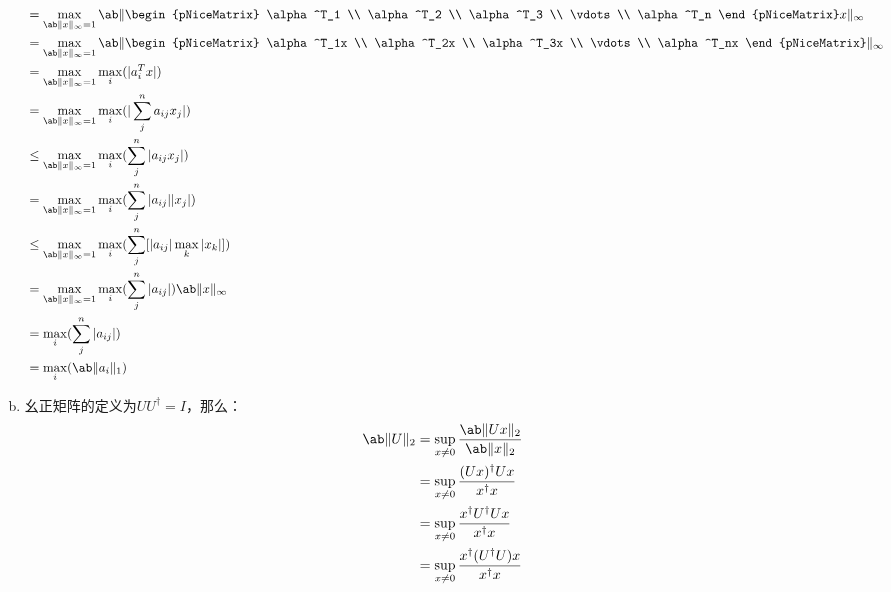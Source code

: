 \documentclass[12pt, a4paper, oneside]{article}
\begin{document}
\begin{enumerate}[(a)]
\begin{align*}
                    &= \max_{\norm{x}_\infty=1}\norm{
                    \begin{pNiceMatrix}
                    \alpha^T_1 \\
                    \alpha^T_2 \\
                    \alpha^T_3 \\
                    \vdots \\
                    \alpha^T_n 
                    \end{pNiceMatrix}x}_\infty\\
                    &= \max_{\norm{x}_\infty=1} \norm{\begin{pNiceMatrix}
                    \alpha^T_1x \\
                    \alpha^T_2x \\
                    \alpha^T_3x \\
                    \vdots \\
                    \alpha^T_nx
                    \end{pNiceMatrix}}_\infty\\
                    &= \max_{\norm{x}_\infty=1} \max_i(|a_i^Tx|)\\
                    &= \max_{\norm{x}_\infty=1} \max_i(|\sum_j^n{a_{ij}x_j}|)\\
                    &\le \max_{\norm{x}_\infty=1} \max_i(\sum_j^n{|a_{ij}x_j}|)\\
                    &= \max_{\norm{x}_\infty=1} \max_i(\sum_j^n{|a_{ij}||x_j}|)\\
                    &\le \max_{\norm{x}_\infty=1} \max_i(\sum_j^n[|a_{ij}|\max_k|x_k|])\\
                    &= \max_{\norm{x}_\infty=1} \max_i(\sum_j^n|a_{ij}|)\norm{x}_\infty\\
                    &= \max_i(\sum_j^n|a_{ij}|) \\
                    &= \max_i(\norm{a_i}_1)
\end{align*}
\item 幺正矩阵的定义为$UU^{\dagger}=I$，那么：
\begin{align*}
    \norm{U}_2 &= \sup_{x\neq 0}\frac{\norm{Ux}_2}{\norm{x}_2}\\
    &=\sup_{x\neq 0}\frac{(Ux)^\dagger Ux}{x^\dagger x}\\
    &=\sup_{x\neq 0}\frac{x^\dagger U^\dagger Ux}{x^\dagger x}\\
    &=\sup_{x\neq 0}\frac{x^\dagger (U^\dagger U)x}{x^\dagger x}\\

\end{align*}
\end{enumerate}
\end{document}

